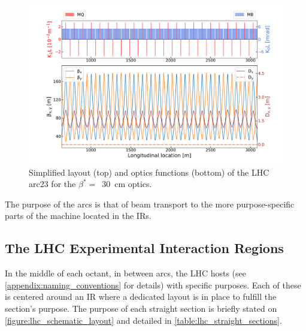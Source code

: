 \begin{figure}[!hbt]
  \centering
  \includegraphics*[width=\linewidth]{Figures/Optics_Measurements_Corrections_at_LHC/lhc_arc23.pdf}
  \caption{Simplified layout (top) and optics functions (bottom) of the LHC arc\num{23} for the \(\beta^{\ast} =\)~\qty{30}{\centi\meter} optics.}
  \label{figure:lhc_arc23_latwiss}
\end{figure}

The purpose of the arcs is that of beam transport to the more purpose-specific parts of the machine located in the \glspl{IR}.

\subsection{The LHC Experimental Interaction Regions}
\label{subsection:lhc_eirs}

In the middle of each octant, in between arcs, the \gls{LHC} hosts  (see \cref{appendix:naming_conventions} for details) with specific purposes.
Each of these is centered around an \acrfull{IR} where a dedicated layout is in place to fulfill the section's purpose.
The purpose of each straight section is briefly stated on \cref{figure:lhc_schematic_layout} and detailed in \cref{table:lhc_straight_sections}.
\\

